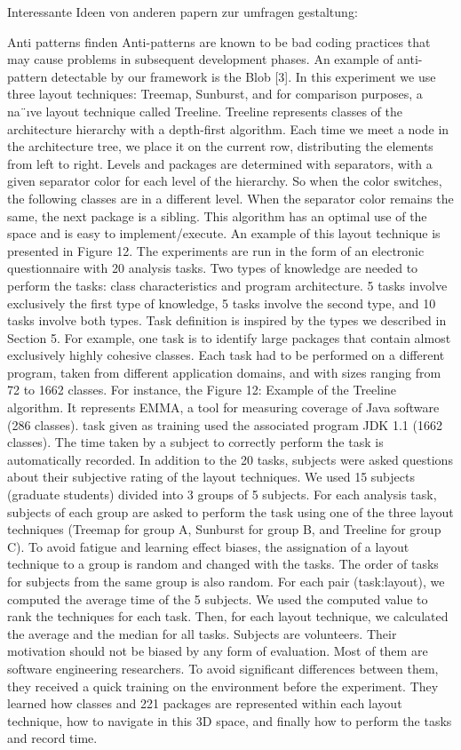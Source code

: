 Interessante Ideen von anderen papern zur umfragen gestaltung:

Anti patterns finden
Anti-patterns are known to be bad
coding practices that may cause problems in subsequent development phases. An example of anti-pattern detectable by
our framework is the Blob [3].
\cite{visbasedlarge}
In this experiment we use three layout techniques: Treemap,
Sunburst, and for comparison purposes, a na¨ıve layout technique called Treeline.
Treeline represents classes of the architecture hierarchy
with a depth-first algorithm. Each time we meet a node in
the architecture tree, we place it on the current row, distributing the elements from left to right. Levels and packages are determined with separators, with a given separator color for each level of the hierarchy. So when the color
switches, the following classes are in a different level. When
the separator color remains the same, the next package is a
sibling. This algorithm has an optimal use of the space and
is easy to implement/execute. An example of this layout
technique is presented in Figure 12.
The experiments are run in the form of an electronic questionnaire with 20 analysis tasks. Two types of knowledge are
needed to perform the tasks: class characteristics and program architecture. 5 tasks involve exclusively the first type
of knowledge, 5 tasks involve the second type, and 10 tasks
involve both types. Task definition is inspired by the types
we described in Section 5. For example, one task is to identify large packages that contain almost exclusively highly
cohesive classes. Each task had to be performed on a different program, taken from different application domains, and
with sizes ranging from 72 to 1662 classes. For instance, the
Figure 12: Example of the Treeline algorithm. It
represents EMMA, a tool for measuring coverage of
Java software (286 classes).
task given as training used the associated program JDK 1.1
(1662 classes).
The time taken by a subject to correctly perform the task
is automatically recorded. In addition to the 20 tasks, subjects were asked questions about their subjective rating of
the layout techniques. We used 15 subjects (graduate students) divided into 3 groups of 5 subjects. For each analysis
task, subjects of each group are asked to perform the task
using one of the three layout techniques (Treemap for group
A, Sunburst for group B, and Treeline for group C). To avoid
fatigue and learning effect biases, the assignation of a layout
technique to a group is random and changed with the tasks.
The order of tasks for subjects from the same group is also
random. For each pair (task:layout), we computed the average time of the 5 subjects. We used the computed value
to rank the techniques for each task. Then, for each layout
technique, we calculated the average and the median for all
tasks.
Subjects are volunteers. Their motivation should not be
biased by any form of evaluation. Most of them are software
engineering researchers. To avoid significant differences between them, they received a quick training on the environment before the experiment. They learned how classes and
221
packages are represented within each layout technique, how
to navigate in this 3D space, and finally how to perform the
tasks and record time.